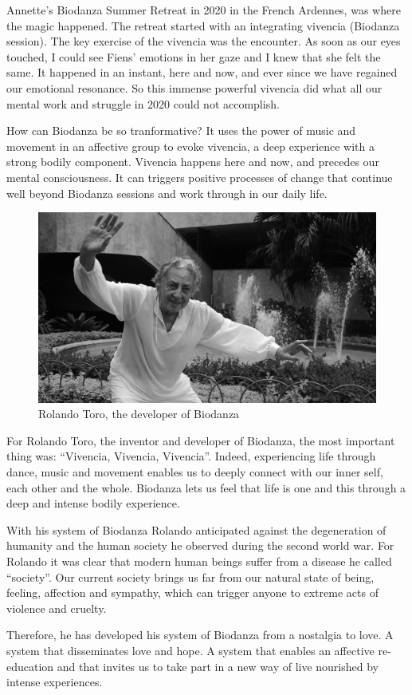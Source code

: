 \documentclass[
  11pt,
]{book}
\begin{document}
Annette's Biodanza Summer Retreat in 2020 in the French Ardennes, was where the magic happened. The retreat started with an integrating vivencia (Biodanza session). The key exercise of the vivencia was the encounter. As soon as our eyes touched, I could see Fiens' emotions in her gaze and I knew that she felt the same. It happened in an instant, here and now, and ever since we have regained our emotional resonance. So this immense powerful vivencia did what all our mental work and struggle in 2020 could not accomplish.

How can Biodanza be so tranformative?
It uses the power of music and movement in an affective group to evoke vivencia, a deep experience with a strong bodily component. Vivencia happens here and now, and precedes our mental consciousness. It can triggers positive processes of change that continue well beyond Biodanza sessions and work through in our daily life.

\begin{figure}

{\centering \includegraphics[width=0.45\linewidth]{./figs/rolando} 

}

\caption{Rolando Toro, the developer of Biodanza}\label{fig:rolandoToro}
\end{figure}

For Rolando Toro, the inventor and developer of Biodanza, the most important thing was: ``Vivencia, Vivencia, Vivencia''. Indeed, experiencing life through dance, music and movement enables us to deeply connect with our inner self, each other and the whole. Biodanza lets us feel that life is one and this through a deep and intense bodily experience.

With his system of Biodanza Rolando anticipated against the degeneration of humanity and the human society he observed during the second world war. For Rolando it was clear that modern human beings suffer from a disease he called ``society''. Our current society brings us far from our natural state of being, feeling, affection and sympathy, which can trigger anyone to extreme acts of violence and cruelty.

Therefore, he has developed his system of Biodanza from a nostalgia to love. A system that disseminates love and hope. A system that enables an affective re-education and that invites us to take part in a new way of live nourished by intense experiences.
\end{document}
